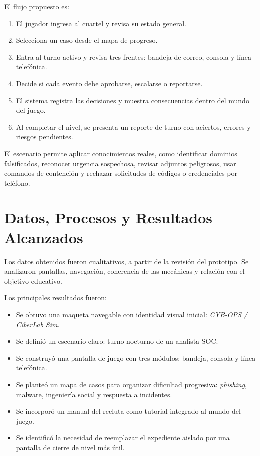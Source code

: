 \documentclass[12pt]{article}
\begin{document}
El flujo propuesto es:

\begin{enumerate}
    \item El jugador ingresa al cuartel y revisa su estado general.
    \item Selecciona un caso desde el mapa de progreso.
    \item Entra al turno activo y revisa tres frentes: bandeja de correo, consola y línea telefónica.
    \item Decide si cada evento debe aprobarse, escalarse o reportarse.
    \item El sistema registra las decisiones y muestra consecuencias dentro del mundo del juego.
    \item Al completar el nivel, se presenta un reporte de turno con aciertos, errores y riesgos pendientes.
\end{enumerate}

El escenario permite aplicar conocimientos reales, como identificar dominios falsificados, reconocer urgencia sospechosa, revisar adjuntos peligrosos, usar comandos de contención y rechazar solicitudes de códigos o credenciales por teléfono.

\section{Datos, Procesos y Resultados Alcanzados}

Los datos obtenidos fueron cualitativos, a partir de la revisión del prototipo. Se analizaron pantallas, navegación, coherencia de las mecánicas y relación con el objetivo educativo.

Los principales resultados fueron:

\begin{itemize}
    \item Se obtuvo una maqueta navegable con identidad visual inicial: \textit{CYB-OPS / CiberLab Sim}.
    \item Se definió un escenario claro: turno nocturno de un analista SOC.
    \item Se construyó una pantalla de juego con tres módulos: bandeja, consola y línea telefónica.
    \item Se planteó un mapa de casos para organizar dificultad progresiva: \textit{phishing}, malware, ingeniería social y respuesta a incidentes.
    \item Se incorporó un manual del recluta como tutorial integrado al mundo del juego.
    \item Se identificó la necesidad de reemplazar el expediente aislado por una pantalla de cierre de nivel más útil.
\end{itemize}
\end{document}

